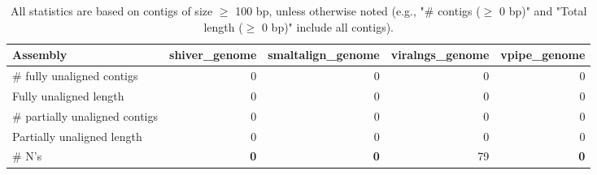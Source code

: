 \documentclass[12pt,a4paper]{article}
\begin{document}
\begin{table}[ht]
\begin{center}
\caption{All statistics are based on contigs of size $\geq$ 100 bp, unless otherwise noted (e.g., "\# contigs ($\geq$ 0 bp)" and "Total length ($\geq$ 0 bp)" include all contigs).}
\begin{tabular}{|l*{4}{|r}|}
\hline
Assembly & shiver\_genome & smaltalign\_genome & viralngs\_genome & vpipe\_genome \\ \hline
\# fully unaligned contigs & 0 & 0 & 0 & 0 \\ \hline
Fully unaligned length & 0 & 0 & 0 & 0 \\ \hline
\# partially unaligned contigs & 0 & 0 & 0 & 0 \\ \hline
Partially unaligned length & 0 & 0 & 0 & 0 \\ \hline
\# N's & {\bf 0} & {\bf 0} & 79 & {\bf 0} \\ \hline
\end{tabular}
\end{center}
\end{table}
\end{document}
